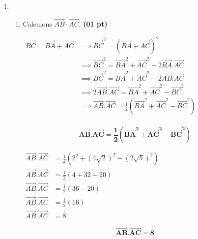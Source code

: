 \documentclass[12pt,a4paper]{article}
\begin{document}
\begin{enumerate}
    \item 
    \begin{enumerate}
        \item Calculons \( \overrightarrow{AB} \cdot \overrightarrow{AC} \). \hfill \textbf{(01 pt)}
        
        \( 
        \begin{aligned}  
        \overrightarrow{BC}=\overrightarrow{BA}+\overrightarrow{AC} &\implies \overrightarrow{BC}^{2}=(\overrightarrow{BA}+\overrightarrow{AC})^{2}\\
        &\implies \overrightarrow{BC}^{2}=\overrightarrow{BA}^{2}+\overrightarrow{AC}^{2}+2\overrightarrow{BA}.\overrightarrow{AC}\\
        &\implies \overrightarrow{BC}^{2}=\overrightarrow{BA}^{2}+\overrightarrow{AC}^{2}-2\overrightarrow{AB}.\overrightarrow{AC}\\
        &\implies 2\overrightarrow{AB}.\overrightarrow{AC}=\overrightarrow{BA}^{2}+\overrightarrow{AC}^{2}-\overrightarrow{BC}^{2}\\
        &\implies \overrightarrow{AB}.\overrightarrow{AC}=\frac{1}{2}\left( \overrightarrow{BA}^{2}+\overrightarrow{AC}^{2}-\overrightarrow{BC}^{2}\right) \\
        \end{aligned}
        \)

\begin{resultbox}
    \[
    \mathbf{\overrightarrow{AB}.\overrightarrow{AC}=\frac{1}{2}\left( \overrightarrow{BA}^{2}+\overrightarrow{AC}^{2}-\overrightarrow{BC}^{2}\right)}
    \]
\end{resultbox}        
        
        \( 
        \begin{aligned}    
       \overrightarrow{AB}.\overrightarrow{AC}&=\frac{1}{2}\left( 2^{2}+(4\sqrt{2})^{2}-(2\sqrt{5})^{2}\right) \\
       \overrightarrow{AB}.\overrightarrow{AC}&=\frac{1}{2}\left( 4+32-20\right)\\
       \overrightarrow{AB}.\overrightarrow{AC}&=\frac{1}{2}\left( 36-20\right)\\
       \overrightarrow{AB}.\overrightarrow{AC}&=\frac{1}{2}\left( 16\right)\\
       \overrightarrow{AB}.\overrightarrow{AC}&=8
        \end{aligned}
        \)
        
\begin{resultbox}
    \[
    \mathbf{\overrightarrow{AB}.\overrightarrow{AC}=8}
    \]
\end{resultbox} 


\end{enumerate}
\end{enumerate}
\end{document}
